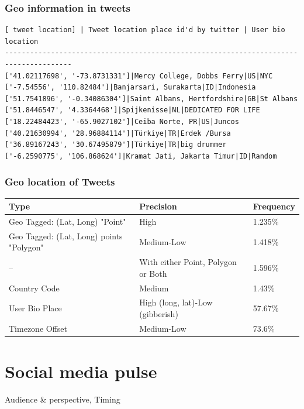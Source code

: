 \documentclass{beamer}
\begin{document}
\begin{frame}[fragile]
\frametitle{Geo information in tweets}
\begin{verbatim}
[ tweet location] | Tweet location place id'd by twitter | User bio location
--------------------------------------------------------------------------------------
['41.02117698', '-73.8731331']|Mercy College, Dobbs Ferry|US|NYC
['-7.54556', '110.82484']|Banjarsari, Surakarta|ID|Indonesia
['51.7541896', '-0.34086304']|Saint Albans, Hertfordshire|GB|St Albans
['51.8446547', '4.3364468']|Spijkenisse|NL|DEDICATED FOR LIFE
['18.22484423', '-65.9027102']|Ceiba Norte, PR|US|Juncos
['40.21630994', '28.96884114']|Türkiye|TR|Erdek /Bursa
['36.89167243', '30.67495879']|Türkiye|TR|big drummer
['-6.2590775', '106.868624']|Kramat Jati, Jakarta Timur|ID|Random
\end{verbatim}
\end{frame}

\begin{frame}\frametitle{Geo location of Tweets}
\begin{table}
\begin{tabular}{ m{3.5cm} | m{3cm} | m{2cm}}
\hline
Type & Precision & Frequency \\ \hline
Geo Tagged: (Lat, Long) "Point"	& High & 1.235\% \\ \hline
 Geo Tagged: (Lat, Long) points "Polygon" & Medium-Low	& 1.418\% \\ \hline
 -- & With either Point, Polygon or Both & 1.596\% \\\hline
 Country Code &	Medium & 1.43\% \\ \hline
 User Bio Place & High (long, lat)-Low (gibberish) &57.67\% \\ \hline
 Timezone Offset & Medium-Low & 73.6\% \\
 \hline
\end{tabular}
\end{table}
\end{frame}


\section{Social media pulse}


\begin{frame}
\begin{center}
{\Huge Audience \& perspective, Timing}
\end{center}
\end{frame}
\end{document}
